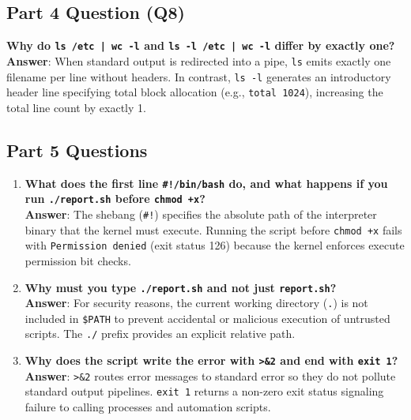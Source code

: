 \documentclass[12pt,a4paper]{article}
\begin{document}
\subsection{Part 4 Question (Q8)}
\textbf{Why do \texttt{ls /etc | wc -l} and \texttt{ls -l /etc | wc -l} differ by exactly one?} \\
\textbf{Answer}: When standard output is redirected into a pipe, \texttt{ls} emits exactly one filename per line without headers. In contrast, \texttt{ls -l} generates an introductory header line specifying total block allocation (e.g., \texttt{total 1024}), increasing the total line count by exactly 1.

\subsection{Part 5 Questions}
\begin{enumerate}
    \item \textbf{What does the first line \texttt{\#!/bin/bash} do, and what happens if you run \texttt{./report.sh} before \texttt{chmod +x}?} \\
    \textbf{Answer}: The shebang (\texttt{\#!}) specifies the absolute path of the interpreter binary that the kernel must execute. Running the script before \texttt{chmod +x} fails with \texttt{Permission denied} (exit status 126) because the kernel enforces execute permission bit checks.
    
    \item \textbf{Why must you type \texttt{./report.sh} and not just \texttt{report.sh}?} \\
    \textbf{Answer}: For security reasons, the current working directory (\texttt{.}) is not included in \texttt{\$PATH} to prevent accidental or malicious execution of untrusted scripts. The \texttt{./} prefix provides an explicit relative path.
    
    \item \textbf{Why does the script write the error with \texttt{>\&2} and end with \texttt{exit 1}?} \\
    \textbf{Answer}: \texttt{>\&2} routes error messages to standard error so they do not pollute standard output pipelines. \texttt{exit 1} returns a non-zero exit status signaling failure to calling processes and automation scripts.
\end{enumerate}

\end{document}
